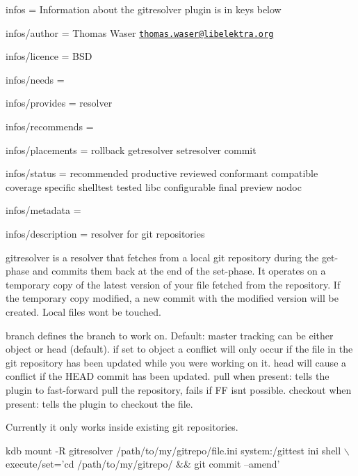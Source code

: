 
\begin{DoxyItemize}
\item infos = Information about the gitresolver plugin is in keys below
\item infos/author = Thomas Waser \href{mailto:thomas.waser@libelektra.org}{\tt thomas.\+waser@libelektra.\+org}
\item infos/licence = B\+SD
\item infos/needs =
\item infos/provides = resolver
\item infos/recommends =
\item infos/placements = rollback getresolver setresolver commit
\item infos/status = recommended productive reviewed conformant compatible coverage specific shelltest tested libc configurable final preview nodoc
\item infos/metadata =
\item infos/description = resolver for git repositories
\end{DoxyItemize}

gitresolver is a resolver that fetches from a local git repository during the get-\/phase and commits them back at the end of the set-\/phase. It operates on a temporary copy of the latest version of your file fetched from the repository. If the temporary copy modified, a new commit with the modified version will be created. Local files won\textquotesingle{}t be touched.

{\ttfamily branch} defines the branch to work on. Default\+: master {\ttfamily tracking} can be either {\ttfamily object} or {\ttfamily head} (default). if set to {\ttfamily object} a conflict will only occur if the file in the git repository has been updated while you were working on it. {\ttfamily head} will cause a conflict if the {\ttfamily H\+E\+AD} commit has been updated. {\ttfamily pull} when present\+: tells the plugin to fast-\/forward pull the repository, fails if FF isn\textquotesingle{}t possible. {\ttfamily checkout} when present\+: tells the plugin to checkout the file.

Currently it only works inside existing git repositories.


\begin{DoxyCode}
kdb mount -R gitresolver /path/to/my/gitrepo/file.ini system:/gittest ini shell \(\backslash\)
    execute/set='cd /path/to/my/gitrepo/ && git commit --amend'
\end{DoxyCode}
 